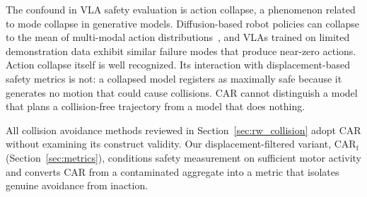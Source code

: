 The confound in VLA safety evaluation is action collapse, a phenomenon related to mode collapse in generative models. Diffusion-based robot policies can collapse to the mean of multi-modal action distributions~\cite{chi2023diffusionpolicy},
and VLAs trained on limited demonstration data exhibit similar failure modes that produce near-zero actions. Action collapse itself is well recognized. Its interaction with displacement-based safety metrics is not: a collapsed model registers as maximally safe because it generates no motion that could cause collisions. CAR cannot distinguish a model that plans a collision-free trajectory from a model that does nothing.

All collision avoidance methods reviewed in Section~\ref{sec:rw_collision} adopt CAR without examining its construct validity. Our displacement-filtered variant, CAR$_\text{f}$ (Section~\ref{sec:metrics}), conditions safety measurement on sufficient motor activity and converts CAR from a contaminated aggregate into a metric that isolates genuine avoidance from inaction.
